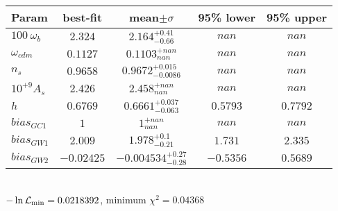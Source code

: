 \begin{tabular}{|l|c|c|c|c|} 
 \hline 
Param & best-fit & mean$\pm\sigma$ & 95\% lower & 95\% upper \\ \hline 
$100~\omega_{b }$ &$2.324$ & $2.164_{-0.66}^{+0.41}$ & $nan$ & $nan$ \\ 
$\omega_{cdm }$ &$0.1127$ & $0.1103_{nan}^{+nan}$ & $nan$ & $nan$ \\ 
$n_{s }$ &$0.9658$ & $0.9672_{-0.0086}^{+0.015}$ & $nan$ & $nan$ \\ 
$10^{+9}A_{s }$ &$2.426$ & $2.458_{nan}^{+nan}$ & $nan$ & $nan$ \\ 
$h$ &$0.6769$ & $0.6661_{-0.063}^{+0.037}$ & $0.5793$ & $0.7792$ \\ 
$bias_{GC 1 }$ &$1$ & $1_{nan}^{+nan}$ & $nan$ & $nan$ \\ 
$bias_{GW 1 }$ &$2.009$ & $1.978_{-0.21}^{+0.1}$ & $1.731$ & $2.335$ \\ 
$bias_{GW 2 }$ &$-0.02425$ & $-0.004534_{-0.28}^{+0.27}$ & $-0.5356$ & $0.5689$ \\ 
\hline 
 \end{tabular} \\ 
$-\ln{\cal L}_\mathrm{min} =0.0218392$, minimum $\chi^2=0.04368$ \\ 
